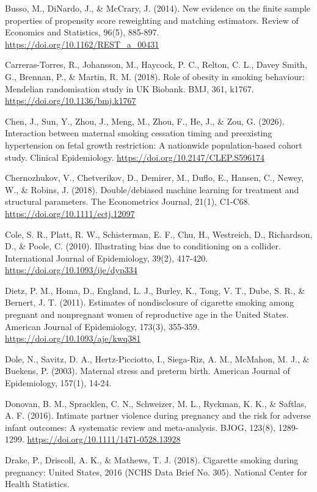 \documentclass[11pt,letterpaper]{article}
\begin{document}
{Busso, M., DiNardo, J., \& McCrary, J. (2014). New evidence on the finite sample properties of propensity score reweighting and matching estimators. Review of Economics and Statistics, 96(5), 885-897. \url{https://doi.org/10.1162/REST_a_00431}

Carreras-Torres, R., Johansson, M., Haycock, P. C., Relton, C. L., Davey Smith, G., Brennan, P., \& Martin, R. M. (2018). Role of obesity in smoking behaviour: Mendelian randomisation study in UK Biobank. BMJ, 361, k1767. \url{https://doi.org/10.1136/bmj.k1767}

Chen, J., Sun, Y., Zhou, J., Meng, M., Zhou, F., He, J., \& Zou, G. (2026). Interaction between maternal smoking cessation timing and preexisting hypertension on fetal growth restriction: A nationwide population-based cohort study. Clinical Epidemiology. \url{https://doi.org/10.2147/CLEP.S596174}

Chernozhukov, V., Chetverikov, D., Demirer, M., Duflo, E., Hansen, C., Newey, W., \& Robins, J. (2018). Double/debiased machine learning for treatment and structural parameters. The Econometrics Journal, 21(1), C1-C68. \url{https://doi.org/10.1111/ectj.12097}

Cole, S. R., Platt, R. W., Schisterman, E. F., Chu, H., Westreich, D., Richardson, D., \& Poole, C. (2010). Illustrating bias due to conditioning on a collider. International Journal of Epidemiology, 39(2), 417-420. \url{https://doi.org/10.1093/ije/dyp334}

Dietz, P. M., Homa, D., England, L. J., Burley, K., Tong, V. T., Dube, S. R., \& Bernert, J. T. (2011). Estimates of nondisclosure of cigarette smoking among pregnant and nonpregnant women of reproductive age in the United States. American Journal of Epidemiology, 173(3), 355-359. \url{https://doi.org/10.1093/aje/kwq381}

Dole, N., Savitz, D. A., Hertz-Picciotto, I., Siega-Riz, A. M., McMahon, M. J., \& Buekens, P. (2003). Maternal stress and preterm birth. American Journal of Epidemiology, 157(1), 14-24.

Donovan, B. M., Spracklen, C. N., Schweizer, M. L., Ryckman, K. K., \& Saftlas, A. F. (2016). Intimate partner violence during pregnancy and the risk for adverse infant outcomes: A systematic review and meta-analysis. BJOG, 123(8), 1289-1299. \url{https://doi.org/10.1111/1471-0528.13928}

Drake, P., Driscoll, A. K., \& Mathews, T. J. (2018). Cigarette smoking during pregnancy: United States, 2016 (NCHS Data Brief No. 305). National Center for Health Statistics.

}
\end{document}
